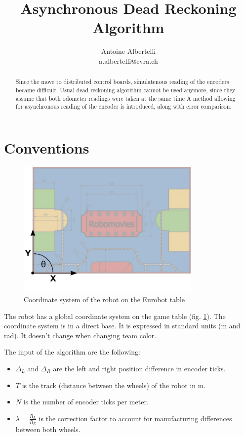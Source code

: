 \documentclass[a4paper]{IEEEtran}
\author{Antoine Albertelli\\{a.albertelli@cvra.ch}}
\title{Asynchronous Dead Reckoning Algorithm}
\begin{document}
\maketitle

\begin{abstract}
    Since the move to distributed control boards, simulatenous reading of the encoders became difficult.
    Usual dead reckoning algorithm cannot be used anymore, since they assume that both odometer readings were taken at the same time
    A method allowing for asynchronous reading of the encoder is introduced, along with error comparison. 
\end{abstract}

\section{Conventions}
\begin{figure}[h]
    \begin{center}
        \includegraphics[width=0.8\textwidth]{table}
        \caption{Coordinate system of the robot on the Eurobot table}
        \label{fig:coordinates}
    \end{center}
\end{figure}

The robot has a global coordinate system on the game table (fig. \ref{fig:coordinates}).
The coordinate system is in a direct base.
It is expressed in standard units (\si{\meter} and \si{\radian}).
It doesn't change when changing team color.

The input of the algorithm are the following:
\begin{itemize}
    \item $\Delta_L$ and $\Delta_R$ are the left and right position difference in encoder ticks.
    \item $T$ is the track (distance between the wheels) of the robot in \si{\meter}.
    \item $N$ is the number of encoder ticks per meter.
    \item $\lambda = \frac{R_L}{R_R}$ is the correction factor to account for manufacturing differences between both wheels.
\end{itemize}
\end{document}
